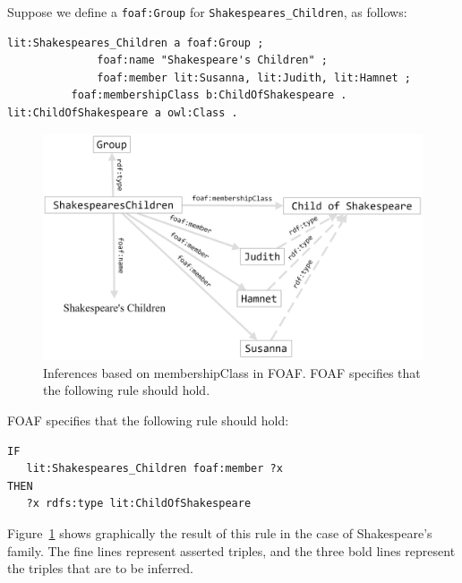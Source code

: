 Suppose we define a \texttt{foaf:Group} for \texttt{Shakespeares\_Children}, as follows:

\begin{lstlisting}
lit:Shakespeares_Children a foaf:Group ;
              foaf:name "Shakespeare's Children" ;
              foaf:member lit:Susanna, lit:Judith, lit:Hamnet ;
	      foaf:membershipClass b:ChildOfShakespeare .
lit:ChildOfShakespeare a owl:Class .
\end{lstlisting}


\begin{figure}
\centering
\includegraphics[width=5in]{SWWOv3/media/ch12/figure12-11.png}
\caption{Inferences based on membershipClass in FOAF. FOAF specifies that the
following rule should hold.}
\label{fig:ch12.11}
\end{figure}


FOAF specifies that the following rule should hold: 

\begin{lstlisting}
IF
   lit:Shakespeares_Children foaf:member ?x
THEN
   ?x rdfs:type lit:ChildOfShakespeare
\end{lstlisting}

Figure~\ref{fig:ch12.11} shows graphically the result of this rule in the case of
Shakespeare's family. The fine lines represent asserted triples, and the
three bold lines represent the triples that are to be inferred.


